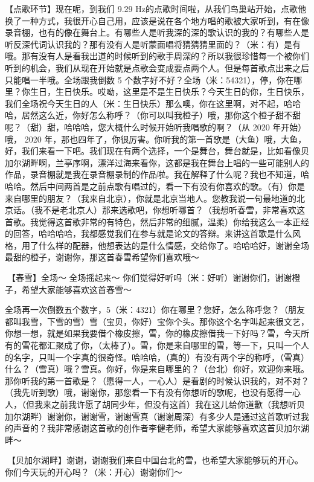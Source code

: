 \documentclass[
]{book}
\begin{document}
【点歌环节】现在呢，到我们 9.29 Hz的点歌时间啦，从我们鸟巢站开始，点歌他换了一种方式，我很开心自己用，应该是说在各个地方唱的歌被大家听到，有在像录音棚，也有的像在舞台上。有哪些人是听我深的深的歌认识的我的？有哪些人是听反深代词认识我的？那有没有人是听蒙面唱将猜猜猜里面的？（米：有）是有哦。那有没有人是看我出道的时候听到的歌手周深的？所以我很珍惜每一个被你们听到的机会，我们从现在开始就是点歌会变成要点两个人。但是每首歌点出来之后只能唱一半哦。全场跟我倒数 5 个数字好不好？全场（米：54321），停，你在哪里？你生日，生日快乐。哎呦，这里是不是生日快乐？今天生日的你，生日快乐，我们全场祝今天生日的人（米：生日快乐）那么噢，你在这里啊，对不起，哈哈哈，居然这么近，你好怎么称呼？（你可以叫我橙子）哦，那你这个橙子甜不甜呢？（甜）甜，哈哈哈，您大概什么时候开始听我唱歌的啊？（从 2020 年开始）哦， 2020 年，那也四年了，你很厉害。你听我的第一首歌是（大鱼）哦，大鱼，好，我们来看一下吧。我们现在有两个选择，一个是舞台，舞台就是，比如看像贝加尔湖畔啊，兰亭序啊，漂洋过海来看你，这都是我在舞台上唱的一些可能别人的作品，录音棚就是我在录音棚录制的作品啦。我在解释了什么呢？我也不知道，哈哈哈。然后中间两首是之前点歌有唱过的，看一下有没有你喜欢的歌。（有）你是来自哪里的朋友？（我来自北京），你就是北京当地人。您教我说一句最地道的北京话。（我不是老北京人）那来选歌吧，你想听哪首？（我想听春雪，非常喜欢这首歌。我觉得这首歌非常的有特色，然后非常的细腻，温柔）你给我这么一本正经的回答，哈哈哈哈，我都感觉我们在参与就是论文的答辩。来讲这首歌是什么风格，用了什么样的配器，他想表达的是什么情感，交给你了。哈哈哈好，谢谢全场最甜的橙子，谢谢你，那这首春雪希望你们喜欢哦～

🎵【春雪】全场～ 全场摇起来～ 你们觉得好听吗（米：好听）谢谢你们，谢谢橙子，希望大家能够喜欢这首春雪～

全场再一次倒数五个数字，5（米：4321）你在哪里？您好，怎么称呼您？（朋友都叫我雪，下雪的雪）雪（宝贝，你好）宝你个头。那你这个名字叫起来很文艺，你想一想，就是如果我要借个橡皮擦，雪，你的橡皮擦借我一下好吗？雪，今天所有的雪花都汇聚成了你，（太棒了）。雪，你是来自哪里的雪，等一下，只叫一个人的名字，只叫一个字真的很奇怪。哈哈哈，（真的）有没有两个字的称呼，（雪真）什么？（雪真）哦？雪真。你好，你是来自哪里的？（台北）你好，欢迎你来哦。那你听我的第一首歌是？（愿得一人，一心人）是看剧的时候认识我的，对不对？（我先听到歌）哦，谢谢你，那您看一下有没有你想听的歌呢，也没有愿得一心人，（但我来之前我许愿了胡同少年，但没有这首）我在这儿给你道歉（我想听贝加尔湖畔）谢谢你，谢谢雪，谢谢雪真（谢谢周深）有多少人是通过这首歌听过我的声音的？我非常感谢这首歌的创作者李健老师，希望大家能够喜欢这首贝加尔湖畔～

🎵【贝加尔湖畔】谢谢，谢谢我们来自中国台北的雪，也希望大家能够玩的开心。你们今天玩的开心吗？（米：开心）谢谢你们～
\end{document}
